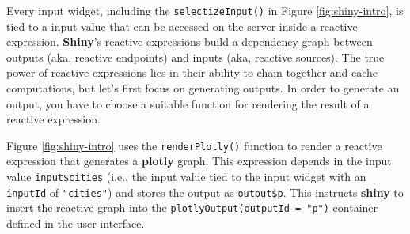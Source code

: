 \documentclass[
  12pt,
]{krantz}
\newenvironment{Shaded}{\begin{snugshade}}{\end{snugshade}}
\newcommand{\ControlFlowTok}[1]{\textcolor[rgb]{0.13,0.29,0.53}{\textbf{#1}}}
\newcommand{\DataTypeTok}[1]{\textcolor[rgb]{0.13,0.29,0.53}{#1}}
\newcommand{\KeywordTok}[1]{\textcolor[rgb]{0.13,0.29,0.53}{\textbf{#1}}}
\newcommand{\NormalTok}[1]{#1}
\newcommand{\OperatorTok}[1]{\textcolor[rgb]{0.81,0.36,0.00}{\textbf{#1}}}
\newcommand{\OtherTok}[1]{\textcolor[rgb]{0.56,0.35,0.01}{#1}}
\newcommand{\StringTok}[1]{\textcolor[rgb]{0.31,0.60,0.02}{#1}}
\begin{document}
Every input widget, including the \texttt{selectizeInput()} in Figure \ref{fig:shiny-intro}, is tied to a input value that can be accessed on the server inside a reactive expression. \textbf{Shiny}'s reactive expressions build a dependency graph between outputs (aka, reactive endpoints) and inputs (aka, reactive sources). The true power of reactive expressions lies in their ability to chain together and cache computations, but let's first focus on generating outputs. In order to generate an output, you have to choose a suitable function for rendering the result of a reactive expression.

Figure \ref{fig:shiny-intro} uses the \texttt{renderPlotly()} function to render a reactive expression that generates a \textbf{plotly} graph. This expression depends in the input value \texttt{input\$cities} (i.e., the input value tied to the input widget with an \texttt{inputId} of \texttt{"cities"}) and stores the output as \texttt{output\$p}. This instructs \textbf{shiny} to insert the reactive graph into the \texttt{plotlyOutput(outputId\ =\ "p")} container defined in the user interface.

\begin{Shaded}
\end{Shaded}
\end{document}
